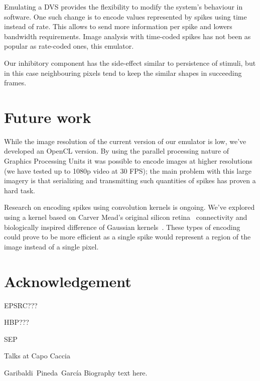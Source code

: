 \documentclass[conference]{IEEEtran}
\begin{document}
Emulating a DVS provides the flexibility to modify the system's behaviour in software. One such change is to encode values represented by spikes using time instead of rate. This allows to send more information per spike and lowers bandwidth requirements. Image analysis with time-coded spikes has not been as popular as rate-coded ones, this emulator.

Our inhibitory component has the side-effect similar to persistence of stimuli, but in this case neighbouring pixels tend to keep the similar shapes in succeeding frames. 

\section{Future work}
\label{sec:future-work}
While the image resolution of the current version of our emulator is low, we've developed an OpenCL version. By using the parallel processing nature of Graphics Processing Units it was possible to encode images at higher resolutions (we have tested up to 1080p video at 30 FPS); the main problem with this large imagery is that serializing and transmitting such quantities of spikes has proven a hard task.

Research on encoding spikes using convolution kernels is ongoing. We've explored using a kernel based on Carver Mead's original silicon retina~\cite{Mead1989} connectivity and biologically inspired difference of Gaussian kernels~\cite{basab}. These types of encoding could prove to be more efficient as a single spike would represent a region of the image instead of a single pixel.
\section*{Acknowledgement}
EPSRC??? 

HBP???

SEP 

Talks at Capo Caccia





\begin{IEEEbiography}{Garibaldi~Pineda~García}
  Biography text here.
\end{IEEEbiography}
\end{document}
